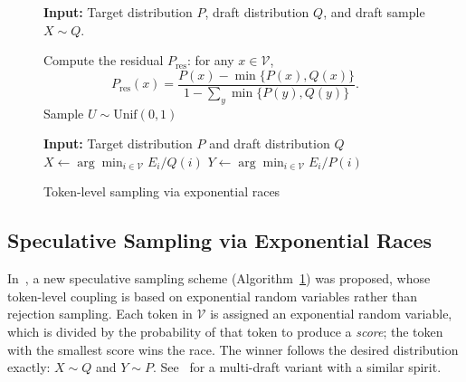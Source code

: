 \documentclass{article}
\theoremstyle{plain}
\theoremstyle{definition}
\begin{document}
 
\begin{figure}[H]
\centering
\begin{minipage}[t]{.51\textwidth}

\begin{algorithm}[H]
\SetAlgoLined
\DontPrintSemicolon
{}
\textbf{Input:} Target distribution $P$, draft distribution $Q$, and draft sample $X \sim Q$. \;

Compute the residual $P_{\mathrm{res}}$: for any $x\in \mathcal{V}$,
\[
P_{\mathrm{res}}(x)=\frac{P(x)-\min\{P(x),Q(x)\}}{1-\sum_y \min\{P(y),Q(y)\}}.
\]
Sample $U \sim \mathrm{Unif}(0,1)$
\;\vspace{2pt}
 
\caption{Token-level sampling~\citep{sun2023spectr, chen2023accelerating, leviathan2023fast}}
\label{alg::max_coupling}
\end{algorithm}

\end{minipage}%
\hfill
\begin{minipage}[t]{.47\textwidth}

\begin{algorithm}[H]
\SetAlgoLined
\DontPrintSemicolon
{}
\textbf{Input:} Target distribution $P$ and draft distribution $Q$\;
$X \gets \arg\min_{i\in \mathcal{V}} E_i/Q(i)$\;
$Y \gets \arg\min_{i\in \mathcal{V}} E_i/P(i)$\;
 
\caption{Token-level sampling via exponential races~\citep{kobus2025speculative}}
\label{alg:ESGD_token}
\end{algorithm}
\end{minipage}
\end{figure}


\subsection*{Speculative Sampling via Exponential Races}

In~\citep{kobus2025speculative}, a new speculative sampling scheme (Algorithm~\ref{alg:ESGD_token}) was proposed, whose token-level coupling is based on exponential random variables rather than rejection sampling. Each token in $\mathcal{V}$ is assigned an exponential random variable, which is divided %
by the %
probability of that token to produce a \emph{score}; 
the token with the smallest score wins the race.
The winner follows the desired distribution exactly: $X \sim Q$ and $Y \sim P$.
See~\citep{rowan2025list} for a multi-draft variant %
with a similar spirit. 
\end{document}
